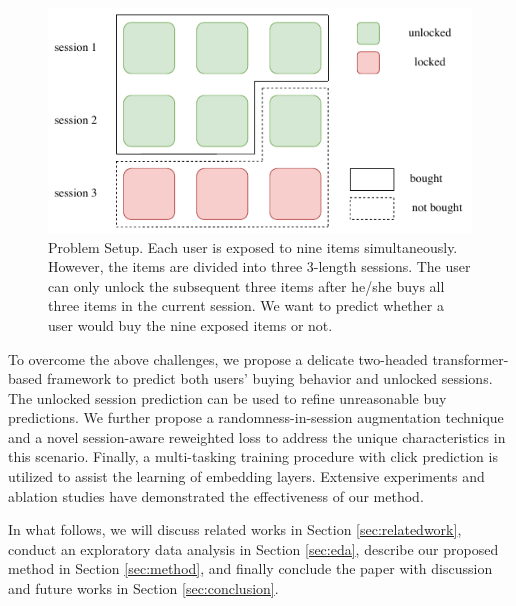 
\begin{figure}[t!]
    \centering
    \includegraphics[width=\linewidth]{figures/problemdef.pdf}
    \caption{Problem Setup. Each user is exposed to nine items simultaneously. However, the items are divided into three 3-length sessions. The user can only unlock the subsequent three items after he/she buys all three items in the current session.
    We want to predict whether a user would buy the nine exposed items or not.}
    \label{fig:problemdef}
\end{figure}


\IEEEpubidadjcol

To overcome the above challenges, we propose a delicate two-headed transformer-based framework to predict both users' buying behavior and unlocked sessions.
The unlocked session prediction can be used to refine unreasonable buy predictions.
We further propose a randomness-in-session augmentation technique and a novel session-aware reweighted loss to address the unique characteristics in this scenario.
Finally, a multi-tasking training procedure with click prediction is utilized to assist the learning of embedding layers.
Extensive experiments and ablation studies have demonstrated the effectiveness of our method.

In what follows, we will discuss related works in Section \ref{sec:relatedwork}, conduct an exploratory data analysis in Section \ref{sec:eda}, describe our proposed method in Section \ref{sec:method}, and finally conclude the paper with discussion and future works in Section \ref{sec:conclusion}.



